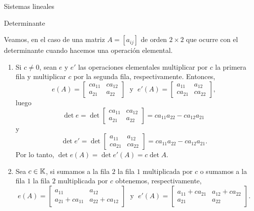 \begin{chapter}{Sistemas lineales}
\begin{section}{Determinante}
    \begin{ejemplo*} Veamos,  en el caso de una matriz $A= [a_{ij}]$ de orden  $2 \times 2$ que ocurre con el determinante cuando hacemos una operación elemental. 
            \begin{enumerate}
            \item Si $c \not=0$, sean $e$ y $e'$ las  operaciones elementales multiplicar por  $c$ la primera fila y multiplicar $c$ por la segunda fila, respectivamente. Entonces,
            \begin{equation*}
            e(A) = \begin{bmatrix} ca_{11}& ca_{12}\\ a_{21}&a_{22}\end{bmatrix}\;\text{ y }\; e'(A) = \begin{bmatrix} a_{11}& a_{12}\\ ca_{21}&ca_{22}\end{bmatrix},
            \end{equation*}
            luego 
            \begin{equation*}
                \det e = \det \begin{bmatrix} ca_{11}& ca_{12}\\ a_{21}&a_{22}\end{bmatrix} = ca_{11}a_{22} - ca_{12}a_{21}\
            \end{equation*}
            y
            \begin{equation*}
              \det e' =  \det \begin{bmatrix} a_{11}& a_{12}\\ ca_{21}&ca_{22}\end{bmatrix} = ca_{11}a_{22} - ca_{12}a_{21}. 
            \end{equation*}
            Por lo tanto, $\det e(A) =\det e'(A) = c \det A$. 
            \item Sea  $c \in \mathbb K$, si sumamos a la fila $2$ la fila $1$ multiplicada por $c$ o sumamos a la fila $1$  la fila $2$ multiplicada por $c$ obtenemos, respectivamente,
            \begin{equation*}
            e(A) = \begin{bmatrix} a_{11}& a_{12}\\ a_{21}+ ca_{11}&a_{22}+ ca_{12}\end{bmatrix}\;\text{ y }\; 
            e'(A) = \begin{bmatrix} a_{11} + ca_{21}& a_{12} + ca_{22}\\ a_{21}&a_{22}\end{bmatrix}.

\end{equation*}
\end{enumerate}
\end{ejemplo*}
\end{section}
\end{chapter}
